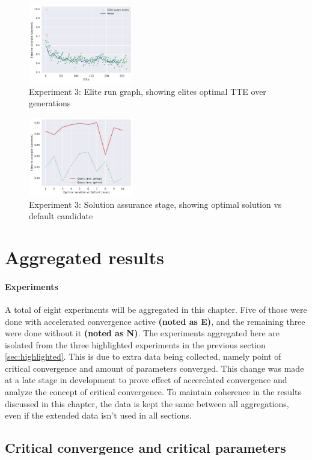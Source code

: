 \documentclass[a4paper,english]{report}
\begin{document}
	\begin{figure}[H]
		\centering
		\includegraphics[width=130pt]{runlogs/final4/3}
		\caption{Experiment 3: Elite run graph, showing elites optimal TTE over generations}
		\label{fig:final33}
	\end{figure}
	\begin{figure}[H]
		\centering
		\includegraphics[width=130pt]{runlogs/final4/4}
		\caption{Experiment 3: Solution assurance stage, showing optimal solution vs default candidate}
		\label{fig:final34}
	\end{figure}
	\clearpage
	\section{Aggregated results}
	\paragraph{Experiments} A total of eight experiments will be aggregated in this chapter. Five of those were done with accelerated convergence active \textbf{(noted as E)}, and the remaining three were done without it \textbf{(noted as N)}. The experiments aggregated here are isolated from the three highlighted experiments in the previous section \ref{sec:highlighted}. This is due to extra data being collected, namely point of critical convergence and amount of parameters converged. This change was made at a late stage in development to prove effect of accerelated convergence and analyze the concept of critical convergence. To maintain coherence in the results discussed in this chapter, the data is kept the same between all aggregations, even if the extended data isn't used in all sections.
	
	\subsection{Critical convergence and critical parameters}
\end{document}
